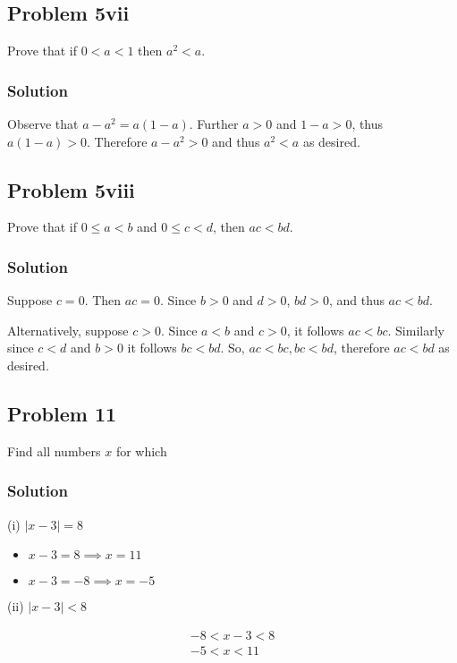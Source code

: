 \subsection*{Problem 5vii}
Prove that if $0<a<1$ then $a^2<a$.

\subsubsection*{Solution}
Observe that $a-a^2=a(1-a)$. Further $a>0$ and $1-a>0$, thus $a(1-a)>0$. Therefore $a-a^2>0$ and thus $a^2<a$ as desired.

\subsection*{Problem 5viii}
Prove that if $0\leq a<b$ and $0\leq c<d$, then $ac<bd$.

\subsubsection*{Solution}
Suppose $c=0$. Then $ac=0$. Since $b>0$ and $d>0$, $bd>0$, and thus $ac<bd$.

\vs

Alternatively, suppose $c>0$. Since $a<b$  and $c>0$, it follows $ac<bc$. Similarly since $c<d$ and $b>0$ it follows $bc<bd$. So, $ac<bc, bc<bd$, therefore $ac<bd$ as desired.

\subsection*{Problem 11}
Find all numbers $x$ for which

\subsubsection*{Solution}
(i) $|x-3|=8$

\begin{itemize}
    \item $x-3=8\implies x=11$
    \item $x-3=-8\implies x=-5$    
\end{itemize}

\vs

(ii) $|x-3|<8$

\begin{align*}
    -8<x-3<8\\
    -5<x<11
\end{align*}

\vs

